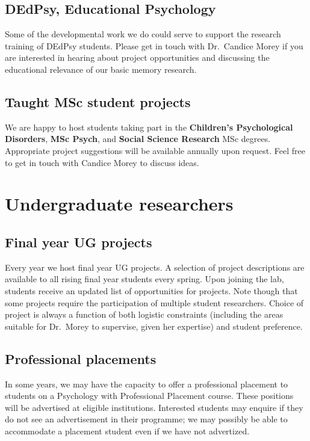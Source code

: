 \documentclass[
  12pt,
]{book}
\begin{document}
\subsection{DEdPsy, Educational Psychology}\label{dedpsy-educational-psychology}

Some of the developmental work we do could serve to support the research training of DEdPsy students. Please get in touch with Dr.~Candice Morey if you are interested in hearing about project opportunities and discussing the educational relevance of our basic memory research.

\subsection{Taught MSc student projects}\label{taught-msc-student-projects}

We are happy to host students taking part in the \textbf{Children's Psychological Disorders}, \textbf{MSc Psych}, and \textbf{Social Science Research} MSc degrees. Appropriate project suggestions will be available annually upon request. Feel free to get in touch with Candice Morey to discuss ideas.

\section{Undergraduate researchers}\label{undergraduate-researchers}

\subsection{Final year UG projects}\label{final-year-ug-projects}

Every year we host final year UG projects. A selection of project descriptions are available to all rising final year students every spring. Upon joining the lab, students receive an updated list of opportunities for projects. Note though that some projects require the participation of multiple student researchers. Choice of project is always a function of both logistic constraints (including the areas suitable for Dr.~Morey to supervise, given her expertise) and student preference.

\subsection{Professional placements}\label{professional-placements}

In some years, we may have the capacity to offer a professional placement to students on a Psychology with Professional Placement course. These positions will be advertised at eligible institutions. Interested students may enquire if they do not see an advertisement in their programme; we may possibly be able to accommodate a placement student even if we have not advertized.
\end{document}
